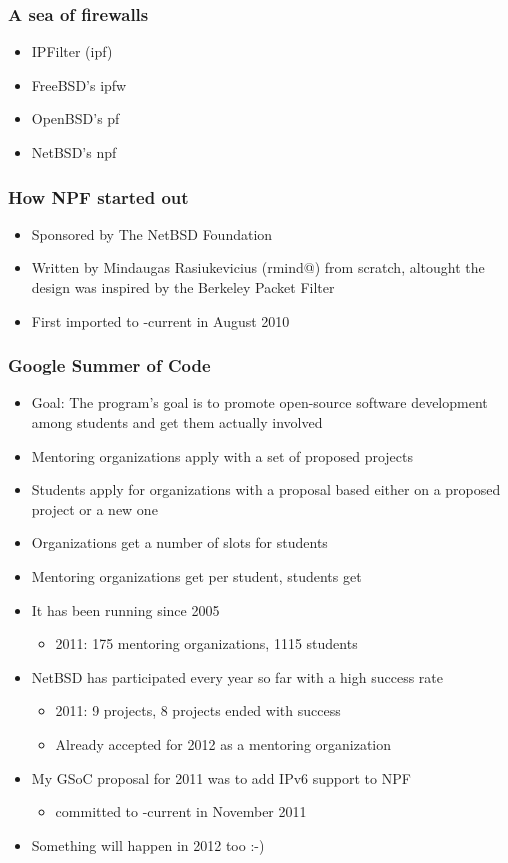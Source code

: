 \documentclass[magyar]{beamer}
\begin{document}
\begin{frame}
\frametitle{A sea of firewalls}
\begin{itemize}
	\item IPFilter (ipf)
	\item FreeBSD's ipfw
	\item OpenBSD's pf
	\item NetBSD's npf
\end{itemize}
\end{frame}

\begin{frame}
\frametitle{How NPF started out}
\begin{itemize}
	\item Sponsored by The NetBSD Foundation
	\item Written by Mindaugas Rasiukevicius (rmind@) from scratch, altought the design was inspired by the Berkeley Packet Filter
	\item First imported to -current in August 2010
\end{itemize}
\end{frame}

\begin{frame}
\frametitle{Google Summer of Code}
\begin{itemize}
	\item Goal: The program's goal is to promote open-source software development among students and get them actually involved
\pause
	\item Mentoring organizations apply with a set of proposed projects
\pause
	\item Students apply for organizations with a proposal based either on a proposed project or a new one
\pause
	\item Organizations get a number of slots for students
\pause
	\item Mentoring organizations get  per student, students get 
\pause
	\item It has been running since 2005
		\begin{itemize}
			\item 2011: 175 mentoring organizations, 1115 students
		\end{itemize}
	\item NetBSD has participated every year so far with a high success rate
		\begin{itemize}
			\item 2011: 9 projects, 8 projects ended with success
			\item Already accepted for 2012 as a mentoring organization
		\end{itemize}
	\item My GSoC proposal for 2011 was to add IPv6 support to NPF
		\begin{itemize}
			\item committed to -current in November 2011
		\end{itemize}
	\item Something will happen in 2012 too :-)
\end{itemize}
\end{frame}
\end{document}
